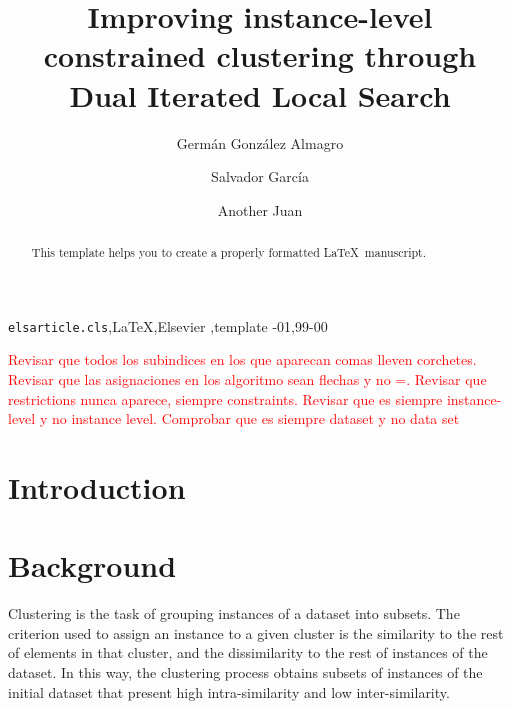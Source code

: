 \documentclass[review]{elsarticle}
\begin{document}
\begin{frontmatter}

\title{Improving instance-level constrained clustering through Dual Iterated Local Search}

\author[mymainaddress]{Germ\'an Gonz\'alez Almagro}

\author[mymainaddress]{Salvador Garc\'ia}

\author[mymainaddress]{Another Juan}

\address[mymainaddress]{Department of Computer Science and Artificial Intelligence, University of Granada, 18071 Granada, Spain}

\begin{abstract}
This template helps you to create a properly formatted \LaTeX\ manuscript.
\end{abstract}

\begin{keyword}
\texttt{elsarticle.cls}\sep \LaTeX\sep Elsevier \sep template
-01\sep  99-00
\end{keyword}

\end{frontmatter}

\linenumbers

\textcolor{red}{Revisar que todos los subindices en los que aparecan comas lleven corchetes. Revisar que las asignaciones en los algoritmo sean flechas y no =. Revisar que restrictions nunca aparece, siempre constraints. Revisar que es siempre instance-level y no instance level. Comprobar que es siempre dataset y no data set}

\section{Introduction}

\section{Background}


Clustering is the task of grouping instances of a dataset into subsets. The criterion used to assign an instance to a given cluster is the similarity to the rest of elements in that cluster, and the dissimilarity to the rest of instances of the dataset. In this way, the clustering process obtains subsets of instances of the initial dataset that present high intra-similarity and low inter-similarity.
\end{document}
